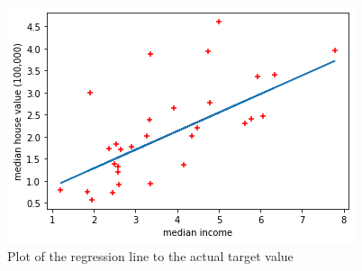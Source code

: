 \documentclass[conference]{IEEEtran}
\begin{document}
\begin{figure}[htbp]
	\includegraphics [scale=0.5]{figures/predicted_vs_actual_graph.png}
	\caption{Plot of the regression line to the actual target value}
	\label{fig:predicted_vs_actual_graph}
\end{figure}



\end{document}
